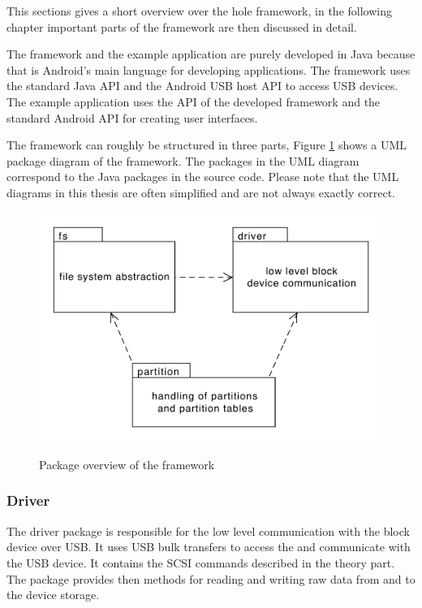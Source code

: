 This sections gives a short overview over the hole framework, in the following chapter important parts of the framework are then discussed in detail.

The framework and the example application are purely developed in Java because that is Android's main language for developing applications. The framework uses the standard Java API and the Android USB host API to access USB devices. The example application uses the API of the developed framework and the standard Android API for creating user interfaces.

The framework can roughly be structured in three parts, Figure \ref{figure:package} shows a UML package diagram of the framework. The packages in the UML diagram correspond to the Java packages in the source code. Please note that the UML diagrams in this thesis are often simplified and are not always exactly correct.

\begin{figure}[h!]
\caption{Package overview of the framework}
\centering
\includegraphics[scale=0.9]{figures/package}
\label{figure:package}
\end{figure}

\subsubsection{Driver}

The driver package is responsible for the low level communication with the block device over USB. It uses USB bulk transfers to access the and communicate with the USB device. It contains the SCSI commands described in the theory part. The package provides then methods for reading and writing raw data from and to the device storage.

